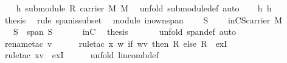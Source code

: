 \begin{isabellebody}
\ {}\ \isamarkupfalse%
\ h{}{\isacharcolon}\ {\isachardoublequoteopen}submodule\ R\ {\isacharparenleft}carrier\ M{\isacharparenright}\ M{\isachardoublequoteclose}\ \isamarkupfalse%
\ {\isacharparenleft}unfold\ submodule{\isacharunderscore}def{\isacharcomma}\ auto{\isacharparenright}\isanewline
\ \ \isamarkupfalse%
\ h{}\ h{}\ \isamarkupfalse%
\ {\isacharquery}thesis\ \isamarkupfalse%
\ {\isacharparenleft}rule\ span{\isacharunderscore}is{\isacharunderscore}subset{\isacharparenright}\isanewline
{}\isamarkupfalse%
%
\endisatagproof
{\isafoldproof}%
%
\isadelimproof
\isanewline
%
\endisadelimproof
\isanewline
{}\isamarkupfalse%
\ {\isacharparenleft}\ module{\isacharparenright}\ in{\isacharunderscore}own{\isacharunderscore}span{\isacharcolon}\ \isanewline
\ \ \ S\isanewline
\ \ \ \ inC{\isacharcolon}{\isachardoublequoteopen}S{\isasymsubseteq}carrier\ M{\isachardoublequoteclose}\isanewline
\ \ \ {\isachardoublequoteopen}S\ {\isasymsubseteq}\ span\ S{\isachardoublequoteclose}\isanewline
%
\isadelimproof
%
\endisadelimproof
%
\isatagproof
{}\isamarkupfalse%
\ {\isacharminus}\ \isanewline
\ \ \isamarkupfalse%
\ inC\ \isamarkupfalse%
\ {\isacharquery}thesis\ \isanewline
\ \ \ \ \isamarkupfalse%
\ {\isacharparenleft}unfold\ span{\isacharunderscore}def{\isacharcomma}\ auto{\isacharparenright}\isanewline
\ \ \ \ \isamarkupfalse%
\ {\isacharparenleft}rename{\isacharunderscore}tac\ v{\isacharparenright}\isanewline
\ \ \ \ \isamarkupfalse%
\ {\isacharparenleft}rule{\isacharunderscore}tac\ x{\isacharequal}{\isachardoublequoteopen}{\isacharparenleft}{\isasymlambda}\ w{\isachardot}\ if\ {\isacharparenleft}w{\isacharequal}v{\isacharparenright}\ then\ {\isasymone}\isactrlbsub R\isactrlesub \ else\ {\isasymzero}\isactrlbsub R\isactrlesub {\isacharparenright}{\isachardoublequoteclose}\ \ exI{\isacharparenright}\isanewline
\ \ \ \ \isamarkupfalse%
\ {\isacharparenleft}rule{\isacharunderscore}tac\ x{\isacharequal}{\isachardoublequoteopen}{\isacharbraceleft}v{\isacharbraceright}{\isachardoublequoteclose}\ \ exI{\isacharparenright}\isanewline
\ \ \ \ \isamarkupfalse%
\ {\isacharparenleft}unfold\ lincomb{\isacharunderscore}def{\isacharparenright}\isanewline
\ \ \ \ \isamarkupfalse%

\end{isabellebody}
